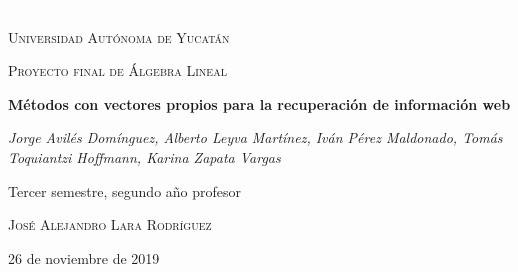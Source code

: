 \documentclass[11pt]{article}
\begin{document}
\begin{titlepage}
	\centering \textcolor{white}{.} \par
	\vspace{1.5cm}
	{\scshape\LARGE Universidad Autónoma de Yucatán \par}
	\vspace{2cm}
	{\scshape\Large Proyecto final de Álgebra Lineal\par}
	\vspace{1.5cm}
	{\huge\bfseries Métodos con vectores propios para la recuperación de información web\par}
	\vspace{2cm}
	{\Large\itshape 
	Jorge Avilés Domínguez,
	Alberto Leyva Martínez,
	Iván Pérez Maldonado,
	Tomás Toquiantzi Hoffmann,
	Karina Zapata Vargas
	\par}
	\vspace{1.5cm}
	{\Large Tercer semestre, segundo año}
	\vfill
	profesor\par
    \textsc{José Alejandro Lara Rodríguez}
	\vfill
	{\large 26 de noviembre de 2019 \par}
\end{titlepage}

\hrulefill
\begin{abstract}
La búsqueda de información web es notoriamente más desafiante que la búsqueda de información en pequeñas colecciones de documentos. La diferencia principal es la estructura y tamaño que conforma a la World Wide Web. Ante esto, se comenzaron a desarrollar y mejorar métodos de búsqueda de información web que fuesen capaces de lidiar con el problema dado, métodos que se apoyan en el álgebra lineal y otros temas de las ciencias de la computación. Aquí nos enfocaremos en los tres métodos más populares que usan el cálculo de eigenvectores.
\end{abstract}
\hrulefill
\end{document}
